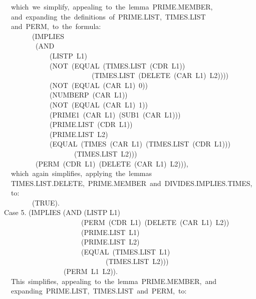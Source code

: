 \documentclass[10pt]{book}
\newenvironment{pubasis}{\begin{flushleft}}{\end{flushleft}}
\begin{document}
\begin{pubasis}
~~which~we~simplify,~appealing~to~the~lemma~PRIME.MEMBER,\\
~~and~expanding~the~definitions~of~PRIME.LIST,~TIMES.LIST\\
~~and~PERM,~to~the~formula:\\

~~~~~~~~(IMPLIES\\
~~~~~~~~~(AND\\
~~~~~~~~~~~~~(LISTP~L1)\\
~~~~~~~~~~~~~(NOT~(EQUAL~(TIMES.LIST~(CDR~L1))\\
~~~~~~~~~~~~~~~~~~~~~~~~~(TIMES.LIST~(DELETE~(CAR~L1)~L2))))\\
~~~~~~~~~~~~~(NOT~(EQUAL~(CAR~L1)~0))\\
~~~~~~~~~~~~~(NUMBERP~(CAR~L1))\\
~~~~~~~~~~~~~(NOT~(EQUAL~(CAR~L1)~1))\\
~~~~~~~~~~~~~(PRIME1~(CAR~L1)~(SUB1~(CAR~L1)))\\
~~~~~~~~~~~~~(PRIME.LIST~(CDR~L1))\\
~~~~~~~~~~~~~(PRIME.LIST~L2)\\
~~~~~~~~~~~~~(EQUAL~(TIMES~(CAR~L1)~(TIMES.LIST~(CDR~L1)))\\
~~~~~~~~~~~~~~~~~~~~(TIMES.LIST~L2)))\\
~~~~~~~~~(PERM~(CDR~L1)~(DELETE~(CAR~L1)~L2))),\\

~~which~again~simplifies,~applying~the~lemmas\\
~~TIMES.LIST.DELETE,~PRIME.MEMBER~and~DIVIDES.IMPLIES.TIMES,\\
~~to:\\

~~~~~~~~(TRUE).\\

Case 5.	(IMPLIES (AND (LISTP L1)\\
~~~~~~~~~~~~~~~~~~~~~~(PERM~(CDR~L1)~(DELETE~(CAR~L1)~L2))\\
~~~~~~~~~~~~~~~~~~~~~~(PRIME.LIST~L1)\\
~~~~~~~~~~~~~~~~~~~~~~(PRIME.LIST~L2)\\
~~~~~~~~~~~~~~~~~~~~~~(EQUAL~(TIMES.LIST~L1)\\
~~~~~~~~~~~~~~~~~~~~~~~~~~~~~(TIMES.LIST~L2)))\\
~~~~~~~~~~~~~~~~~(PERM~L1~L2)).\\

~~This~simplifies,~appealing~to~the~lemma~PRIME.MEMBER,~and\\
~~expanding~PRIME.LIST,~TIMES.LIST~and~PERM,~to:\\


\end{pubasis}
\end{document}
